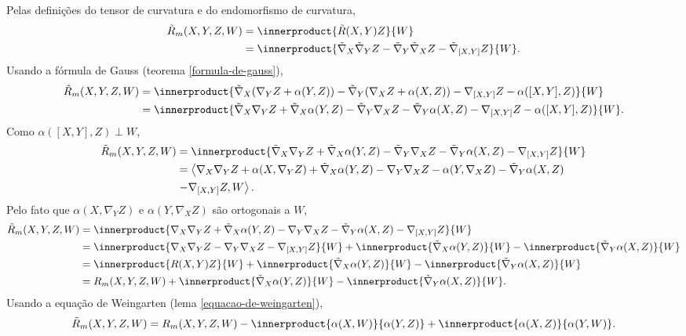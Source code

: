 \begin{demonstracao}
	Pelas definições do tensor de curvatura e do endomorfismo de curvatura,
	\begin{align*}
		\tilde{R}_m(X,Y,Z,W) &= \innerproduct{\tilde{R}(X,Y)Z}{W}\\
		&= \innerproduct{\tilde{\nabla}_X \tilde{\nabla}_Y Z - \tilde{\nabla}_Y \tilde{\nabla}_X Z - \tilde{\nabla}_{[X,Y]} Z}{W}.
	\end{align*}
	Usando a fórmula de Gauss (teorema \ref{formula-de-gauss}),
	\begin{align*}
		\tilde{R}_m(X,Y,Z,W) &= \innerproduct{\tilde{\nabla}_X (\nabla_Y Z + \alpha(Y,Z)) - \tilde{\nabla}_Y (\nabla_X Z + \alpha(X,Z)) - \nabla_{[X,Y]} Z - \alpha([X,Y],Z)}{W}\\
		&= \innerproduct{\tilde{\nabla}_X \nabla_Y Z + \tilde{\nabla}_X \alpha(Y,Z) - \tilde{\nabla}_Y \nabla_X Z - \tilde{\nabla}_Y \alpha(X,Z) - \nabla_{[X,Y]} Z - \alpha([X,Y],Z)}{W}.
	\end{align*}
	Como $\alpha([X,Y],Z) \perp W$,
	\begin{align*}
		\tilde{R}_m(X,Y,Z,W) &= \innerproduct{\tilde{\nabla}_X \nabla_Y Z + \tilde{\nabla}_X \alpha(Y,Z) - \tilde{\nabla}_Y \nabla_X Z - \tilde{\nabla}_Y \alpha(X,Z) - \nabla_{[X,Y]} Z}{W}\\
		&= \left\langle \nabla_X \nabla_Y Z + \alpha(X, \nabla_Y Z) + \tilde{\nabla}_X \alpha(Y,Z) - \nabla_Y \nabla_X Z - \alpha(Y, \nabla_X Z) - \tilde{\nabla}_Y \alpha(X,Z)\right.\\
		& \left. - \nabla_{[X,Y]} Z, W \right\rangle.
	\end{align*}
	Pelo fato que $\alpha(X, \nabla_Y Z)$ e $\alpha(Y, \nabla_X Z)$ são ortogonais a $W$,
	\begin{align*}
		\tilde{R}_m(X,Y,Z,W) &= \innerproduct{\nabla_X \nabla_Y Z + \tilde{\nabla}_X \alpha(Y,Z) - \nabla_Y \nabla_X Z - \tilde{\nabla}_Y \alpha(X,Z) - \nabla_{[X,Y]} Z}{W}\\
		&=  \innerproduct{\nabla_X \nabla_Y Z - \nabla_Y \nabla_X Z - \nabla_{[X,Y]} Z}{W} +  \innerproduct{\tilde{\nabla}_X \alpha(Y,Z)}{W} -  \innerproduct{\tilde{\nabla}_Y \alpha(X,Z)}{W}\\
		&=  \innerproduct{R(X,Y)Z}{W} +  \innerproduct{\tilde{\nabla}_X \alpha(Y,Z)}{W} -  \innerproduct{\tilde{\nabla}_Y \alpha(X,Z)}{W}\\
		&= R_m(X,Y,Z,W) +  \innerproduct{\tilde{\nabla}_X \alpha(Y,Z)}{W} -  \innerproduct{\tilde{\nabla}_Y \alpha(X,Z)}{W}.
	\end{align*}
	Usando a equação de Weingarten (lema \ref{equacao-de-weingarten}),
	\begin{equation*}
		\tilde{R}_m(X,Y,Z,W) = R_m(X,Y,Z,W) - \innerproduct{\alpha(X,W)}{\alpha(Y,Z)} + \innerproduct{\alpha(X,Z)}{\alpha(Y,W)}.
	\end{equation*}
\end{demonstracao}



